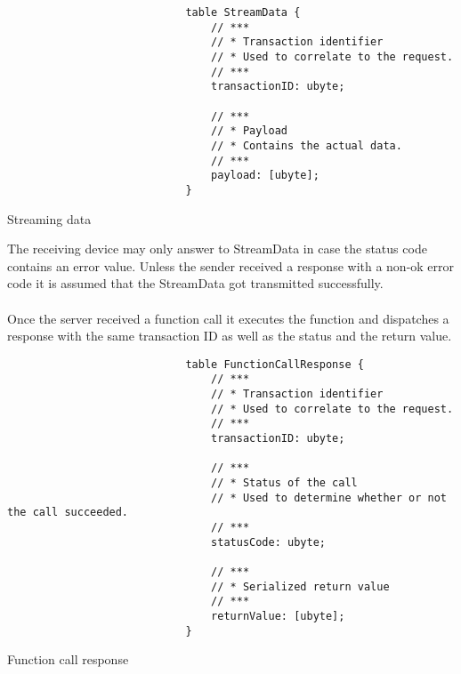 \documentclass[a4paper]{report}
\begin{document}
                    \begin{listing}
                        \begin{verbatim}
                            table StreamData {
                                // ***
                                // * Transaction identifier
                                // * Used to correlate to the request.
                                // ***
                                transactionID: ubyte;
                                
                                // ***
                                // * Payload
                                // * Contains the actual data.
                                // ***
                                payload: [ubyte];
                            }
                        \end{verbatim}
                        \caption{Streaming data}
                        \label{datagram:interaction:streamdata}
                    \end{listing}
                    The receiving device may only answer to StreamData in case the status code contains an error value. Unless the sender received a response with a non-ok error code it is assumed that the StreamData got transmitted successfully.\\
                    \\
                    Once the server received a function call it executes the function and dispatches a response with the same transaction ID as well as the status and the return value.
                    \begin{listing}
                        \begin{verbatim}
                            table FunctionCallResponse {
                                // ***
                                // * Transaction identifier
                                // * Used to correlate to the request.
                                // ***
                                transactionID: ubyte;
                                
                                // ***
                                // * Status of the call
                                // * Used to determine whether or not the call succeeded.
                                // ***
                                statusCode: ubyte;
                                
                                // ***
                                // * Serialized return value
                                // ***
                                returnValue: [ubyte];
                            }
                        \end{verbatim}
                        \caption{Function call response}
                        \label{datagram:interaction:functioncallresponse}
                    \end{listing}
                    
\end{document}
